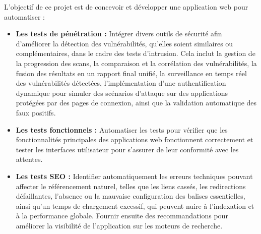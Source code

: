 \begin{justify}
        L’objectif de ce projet est de concevoir et développer une application web pour automatiser :
        \begin{itemize}[left=-0.1cm, label=$\bullet$]
            \item \textbf{Les tests de pénétration :} Intégrer divers outils de sécurité afin d'améliorer la détection des vulnérabilités, qu’elles soient similaires ou complémentaires, dans le cadre des tests d'intrusion. Cela inclut la gestion de la progression des scans, la comparaison et la corrélation des vulnérabilités, la fusion des résultats en un rapport final unifié, la surveillance en temps réel des vulnérabilités détectées, l’implémentation d’une authentification dynamique pour simuler des scénarios d’attaque sur des applications protégées par des pages de connexion, ainsi que la validation automatique des faux positifs.
            \item \textbf{Les tests fonctionnels :} Automatiser les tests pour vérifier que les fonctionnalités principales des applications web fonctionnent correctement et tester les interfaces utilisateur pour s'assurer de leur conformité avec les attentes.
            \item \textbf{Les tests SEO :} Identifier automatiquement les erreurs techniques pouvant affecter le référencement naturel, telles que les liens cassés, les redirections défaillantes, l’absence ou la mauvaise configuration des balises essentielles, ainsi qu’un temps de chargement excessif, qui peuvent nuire à l’indexation et à la performance globale. Fournir ensuite des recommandations pour améliorer la visibilité de l’application sur les moteurs de recherche.
        \end{itemize}
    

\end{justify}
